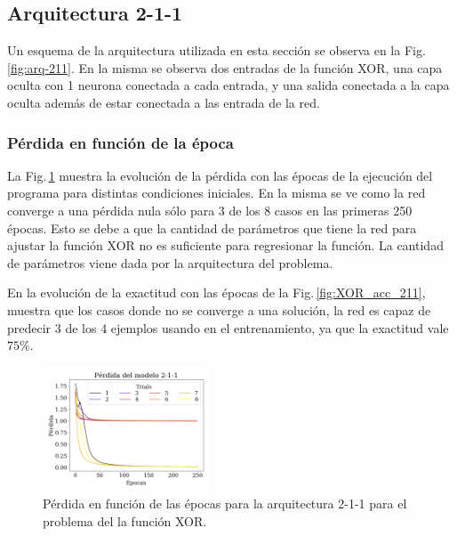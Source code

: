 \subsection*{Arquitectura 2-1-1}
Un esquema de la arquitectura utilizada en esta sección se observa en la Fig.\,\ref{fig:arq-211}. En la misma se observa dos entradas de la función XOR, una capa oculta con 1 neurona conectada a cada entrada, y una salida conectada a la capa oculta además de estar conectada a las entrada de la red.

\subsubsection*{Pérdida en función de la época}


La Fig.\,\ref{fig:XOR_err_211} muestra la evolución de la pérdida con las épocas de la ejecución del programa para distintas condiciones iniciales. En la misma se ve como la red converge a una pérdida nula sólo para 3 de los 8 casos en las primeras 250 épocas. Esto se debe a que la cantidad de parámetros que tiene la red para ajustar la función XOR no es suficiente para regresionar la función. La cantidad de parámetros viene dada por la arquitectura del problema.

En la evolución  de la exactitud  con las épocas de la Fig.\,\ref{fig:XOR_acc_211}, muestra que los casos donde no se converge a una solución, la red es capaz  de predecir 3 de los 4 ejemplos usando en el entrenamiento, ya que la exactitud vale $75\%$.

\begin{figure}[H]
	\centering
	\includegraphics[width=0.44\textwidth]{../Graficos/ejer_1_2-1-1_los.png}
	\caption{Pérdida en función de las épocas para la arquitectura 2-1-1 para el problema del la función XOR.}
	\label{fig:XOR_err_211}
\end{figure}


